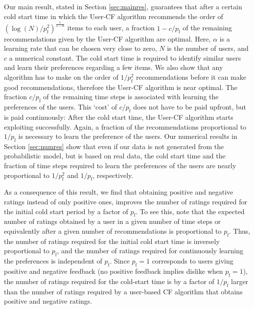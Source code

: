 \documentclass{article}
\newcommand\pf{p_{\mathrm{f}}}
\newcommand\nuser{N} %
\begin{document}
Our main result, stated in Section \ref{sec:mainres}, guarantees that
after a certain cold start time
in which the User-CF algorithm recommends  the order of $(\log (\nuser) /\pf^2)^{\frac{1}{1-\alpha}}$ items to each user,
a fraction $1 - c/\pf$ of the remaining recommendations given by the User-CF algorithm are optimal. 
Here, $\alpha$ is a learning rate that can be chosen very close to zero, $\nuser$ is the number of users,  and $c$ a numerical constant. 
The cold start time is required to identify similar users and learn their preferences regarding a few items. 
We also show that any algorithm has to make on the order of $1/\pf^2$ recommendations before it can make good recommendations, therefore the User-CF algorithm is near optimal. 
The fraction $c/\pf$ of the remaining time steps is associated with learning the preferences of the users. %
This `cost' of $c/\pf$ does not have to be paid upfront, but is paid continuously: After the cold start time, the User-CF algorithm starts exploiting successfully. %
Again, a fraction of the recommendations proportional to $1/\pf$ is necessary to learn the preference of the users. 
Our numerical results in Section \ref{sec:numres} show that even if our data is not generated from the probabilistic model, but is based on real data, the cold start time and the fraction of time steps required to learn the preferences of the users are nearly proportional to $1/\pf^2$ and $1/\pf$, respectively. 

As a consequence of %
this result, we find that obtaining positive and negative ratings instead of only positive ones, improves the number of ratings required for the initial cold start period by a factor of $\pf$. 
To see this, note that the expected number of ratings obtained by a user 
in a given number of time steps or equivalently after a given number of recommendations is proportional to $\pf$. 
Thus, the number of ratings required for the initial cold start time is inversely proportional to $\pf$, and the number of ratings required for continuously learning the preferences is independent of $\pf$. 
Since $\pf=1$ corresponds to users giving positive and negative feedback (no positive feedback implies dislike when $\pf=1$), %
the number of ratings required for the cold-start time is by a factor of $1/\pf$ larger than the number of ratings required by a user-based CF algorithm that obtains positive and negative ratings. 
\end{document}
